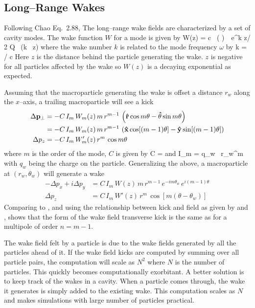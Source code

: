 \subsection{Long--Range Wakes}

Following Chao\cite{b:chao} Eq.~2.88, The long--range wake fields are
characterized by a set of cavity modes. The wake function $W$ for a
mode is given by
\Begineq
  W(z) = c \, \left(  \right) \,\,
  e^{k z/ 2 Q} \, \sin (k \, z)
  \label{wcrq}
\Endeq
where the wake number $k$ is related to the mode frequency $\omega$ by
\Begineq
  k = \omega / c
\Endeq
Here $z$ is the distance behind the particle generating the wake. $z$
is negative for all particles affected by the wake so $W(z)$ is a
decaying exponential as expected.

Assuming that the macroparticle generating the wake is offset a
distance $r_w$ along the $x$--axis, a trailing macroparticle will see a kick
\begin{align}
  \Delta {{\bf p}}_\perp &= 
    -C \, I_m \, W_m(z) \, m \, r^{m-1} \, \left( 
    {\bf\hat r} \cos m\theta - {\bf\hat\theta} \sin m\theta \right) \\
  &= -C \, I_m \, W_m(z) \, m \, r^{m-1} \, \left( 
    {\bf\hat x} \cos [(m-1) \theta] - 
    {\bf\hat y} \sin [(m-1)\theta] \right) \nonumber \\
  \Delta p_z &= -C \, I_m \, W'_m(z) \, r^m \, \cos m\theta
\end{align}
where $m$ is the order of the mode, $C$ is given by
\Begineq
  C = 
\Endeq
 and
\Begineq
  I_m = q_w \, r_w^m
\Endeq
with $q_w$ being the charge on the particle. Generalizing the above, a
macroparticle at $(r_w, \theta_w)$ will generate a wake
\begin{align}
  -\Delta p_x + i\Delta p_y &= C \, I_m \, W(z) \, 
    m \, r^{m-1} \, e^{-i m \theta_w} \, e^{i (m-1) \theta} 
    \label{ppcimr} \\
  \Delta p_z &= C \, I_m \, W'(z) \, r^m \, \cos [m(\theta - \theta_w)]
    \label{pciwr}
\end{align}
Comparing  to , and using the relationship between
kick and field as given by  and , shows that
the form of the wake field transverse kick is the same as for a
multipole of order $n = m - 1$. 

The wake field felt by a particle is due to the wake fields generated by
all the particles ahead of it. If the wake field kicks are computed by
summing over all particle pairs, the
computation will scale as $N^2$ where $N$ is the number of
particles. This quickly becomes computationally exorbitant. A better
solution is to keep track of the wakes in a cavity. When a particle
comes through, the wake it generates is simply added to the existing
wake. This computation scales as $N$ and makes simulations with large
number of particles practical. 

